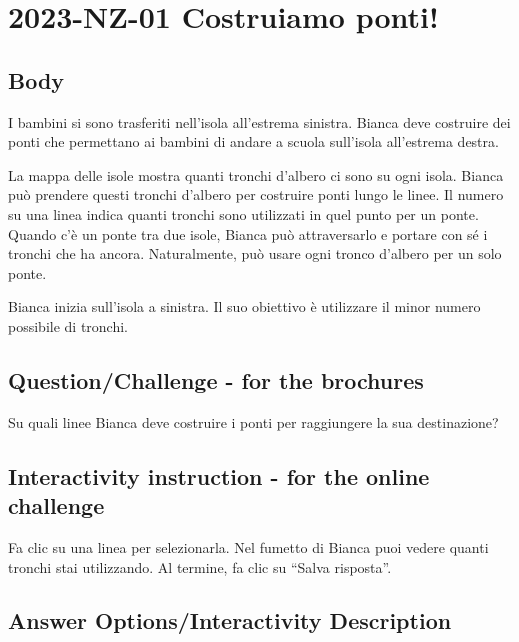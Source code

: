\documentclass[a4paper,11pt]{report}
\newcommand{\taskGraphicsFolder}{..}
\begin{document}
\section*{\centering{} 2023-NZ-01 Costruiamo ponti!}


\subsection*{Body}

I bambini si sono trasferiti nell’isola all’estrema sinistra.
Bianca deve costruire dei ponti che permettano ai bambini di andare a scuola sull’isola all’estrema destra.

La mappa delle isole mostra quanti tronchi d’albero ci sono su ogni isola.
Bianca può prendere questi tronchi d’albero per costruire ponti lungo le linee.
Il numero su una linea indica quanti tronchi sono utilizzati in quel punto per un ponte.
Quando c’è un ponte tra due isole, Bianca può attraversarlo e portare con sé i tronchi che ha ancora.
Naturalmente, può usare ogni tronco d’albero per un solo ponte.

Bianca inizia sull’isola a sinistra.  Il suo obiettivo è utilizzare il minor numero possibile di tronchi.

{\em


\subsection*{Question/Challenge - for the brochures}

Su quali linee Bianca deve costruire i ponti per raggiungere la sua destinazione?

{\centering%
\par}

}


\subsection*{Interactivity instruction - for the online challenge}

Fa clic su una linea per selezionarla. Nel fumetto di Bianca puoi vedere quanti tronchi stai utilizzando. Al termine, fa clic su \enquote{Salva risposta}.

\begingroup
\renewcommand{\arraystretch}{1.5}
\subsection*{Answer Options/Interactivity Description}
\end{document}
